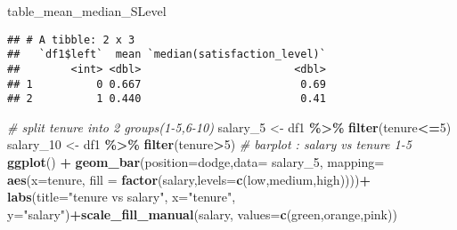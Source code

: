 \documentclass[
]{article}
\newenvironment{Shaded}{\begin{snugshade}}{\end{snugshade}}
\newcommand{\AttributeTok}[1]{\textcolor[rgb]{0.13,0.29,0.53}{#1}}
\newcommand{\CommentTok}[1]{\textcolor[rgb]{0.56,0.35,0.01}{\textit{#1}}}
\newcommand{\DecValTok}[1]{\textcolor[rgb]{0.00,0.00,0.81}{#1}}
\newcommand{\FunctionTok}[1]{\textcolor[rgb]{0.13,0.29,0.53}{\textbf{#1}}}
\newcommand{\NormalTok}[1]{#1}
\newcommand{\OtherTok}[1]{\textcolor[rgb]{0.56,0.35,0.01}{#1}}
\newcommand{\SpecialCharTok}[1]{\textcolor[rgb]{0.81,0.36,0.00}{\textbf{#1}}}
\newcommand{\StringTok}[1]{\textcolor[rgb]{0.31,0.60,0.02}{#1}}
\begin{document}
\begin{Shaded}
\begin{Highlighting}[]
\NormalTok{table\_mean\_median\_SLevel}
\end{Highlighting}
\end{Shaded}

\begin{verbatim}
## # A tibble: 2 x 3
##   `df1$left`  mean `median(satisfaction_level)`
##        <int> <dbl>                        <dbl>
## 1          0 0.667                         0.69
## 2          1 0.440                         0.41
\end{verbatim}

\begin{Shaded}
\begin{Highlighting}[]
\CommentTok{\# split tenure into 2 groups(1{-}5,6{-}10)}
\NormalTok{salary\_5 }\OtherTok{\textless{}{-}}\NormalTok{ df1 }\SpecialCharTok{\%\textgreater{}\%} \FunctionTok{filter}\NormalTok{(tenure}\SpecialCharTok{\textless{}=}\DecValTok{5}\NormalTok{) }
\NormalTok{salary\_10 }\OtherTok{\textless{}{-}}\NormalTok{ df1 }\SpecialCharTok{\%\textgreater{}\%} \FunctionTok{filter}\NormalTok{(tenure}\SpecialCharTok{\textgreater{}}\DecValTok{5}\NormalTok{)}
\CommentTok{\# barplot : salary vs tenure 1{-}5}
\FunctionTok{ggplot}\NormalTok{() }\SpecialCharTok{+} \FunctionTok{geom\_bar}\NormalTok{(}\AttributeTok{position=}\StringTok{\textquotesingle{}dodge\textquotesingle{}}\NormalTok{,}\AttributeTok{data=}\NormalTok{ salary\_5, }\AttributeTok{mapping=} \FunctionTok{aes}\NormalTok{(}\AttributeTok{x=}\NormalTok{tenure, }\AttributeTok{fill =} \FunctionTok{factor}\NormalTok{(salary,}\AttributeTok{levels=}\FunctionTok{c}\NormalTok{(}\StringTok{\textquotesingle{}low\textquotesingle{}}\NormalTok{,}\StringTok{\textquotesingle{}medium\textquotesingle{}}\NormalTok{,}\StringTok{\textquotesingle{}high\textquotesingle{}}\NormalTok{))))}\SpecialCharTok{+}
  \FunctionTok{labs}\NormalTok{(}\AttributeTok{title=}\StringTok{"tenure vs salary"}\NormalTok{, }\AttributeTok{x=}\StringTok{"tenure"}\NormalTok{, }\AttributeTok{y=}\StringTok{"salary"}\NormalTok{)}\SpecialCharTok{+}\FunctionTok{scale\_fill\_manual}\NormalTok{(}\StringTok{\textquotesingle{}salary\textquotesingle{}}\NormalTok{, }\AttributeTok{values=}\FunctionTok{c}\NormalTok{(}\StringTok{\textquotesingle{}green\textquotesingle{}}\NormalTok{,}\StringTok{\textquotesingle{}orange\textquotesingle{}}\NormalTok{,}\StringTok{\textquotesingle{}pink\textquotesingle{}}\NormalTok{))}
\end{Highlighting}
\end{Shaded}
\end{document}

